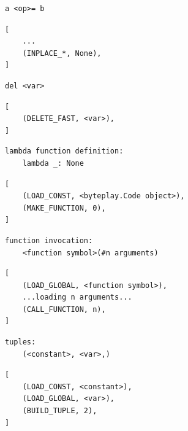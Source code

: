 \documentclass{icldt}
\numberwithin{equation}{section}       %
\begin{document}
{{\newsavebox\threeleft
\begin{lrbox}{\threeleft}
\begin{lstlisting}
a <op>= b
\end{lstlisting}
\end{lrbox}
\newsavebox\threeright
\begin{lrbox}{\threeright}
\begin{lstlisting}
[
	...
	(INPLACE_*, None),
]
\end{lstlisting}
\end{lrbox}

\newsavebox\fourleft
\begin{lrbox}{\fourleft}
\begin{lstlisting}
del <var>
\end{lstlisting}
\end{lrbox}
\newsavebox\fourright
\begin{lrbox}{\fourright}
\begin{lstlisting}
[
	(DELETE_FAST, <var>),
]
\end{lstlisting}
\end{lrbox}

\newsavebox\fiveleft
\begin{lrbox}{\fiveleft}
\begin{lstlisting}
lambda function definition:
	lambda _: None
\end{lstlisting}
\end{lrbox}
\newsavebox\fiveright
\begin{lrbox}{\fiveright}
\begin{lstlisting}
[
	(LOAD_CONST, <byteplay.Code object>),
	(MAKE_FUNCTION, 0),
]
\end{lstlisting}
\end{lrbox}

\newsavebox\sixleft
\begin{lrbox}{\sixleft}
\begin{lstlisting}
function invocation:
	<function symbol>(#n arguments)
\end{lstlisting}
\end{lrbox}
\newsavebox\sixright
\begin{lrbox}{\sixright}
\begin{lstlisting}
[
	(LOAD_GLOBAL, <function symbol>),
	...loading n arguments...
	(CALL_FUNCTION, n),
]
\end{lstlisting}
\end{lrbox}

\newsavebox\sevenleft
\begin{lrbox}{\sevenleft}
\begin{lstlisting}
tuples:
	(<constant>, <var>,)
\end{lstlisting}
\end{lrbox}
\newsavebox\sevenright
\begin{lrbox}{\sevenright}
\begin{lstlisting}
[
	(LOAD_CONST, <constant>),
	(LOAD_GLOBAL, <var>),
	(BUILD_TUPLE, 2),
]
\end{lstlisting}
\end{lrbox}

}}
\end{document}
